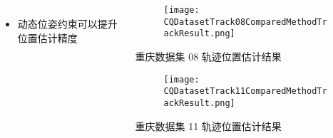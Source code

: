 \begin{frame}
\begin{columns}[t]
\begin{column}{0.6\textwidth}
{{\begin{tabular*}{1.2\linewidth}{@{\extracolsep{\fill}}clrrrrrrrrrrr}
					\bottomrule 
				\end{tabular*}
		   	}}
			\begin{itemize}
				\item 动态位姿约束可以提升位置估计精度
			\end{itemize}
		\end{column} 
		\begin{column}{0.4\textwidth}
    		\vspace{-3.2cm}  
		   	\begin{figure}
    			\texttt{[image: CQDatasetTrack08ComparedMethodTrackResult.png]}
		   	\end{figure}
		   	\vspace{-0.5cm}
		   	\hspace{0.5cm} {\tiny 重庆数据集 08 轨迹位置估计结果}
		   	\vspace{-0.2cm}
		   	\begin{figure}
				\texttt{[image: CQDatasetTrack11ComparedMethodTrackResult.png]}
		   	\end{figure}
		   	\vspace{-0.5cm}
		   	\hspace{0.5cm} {\tiny 重庆数据集 11 轨迹位置估计结果}
		\end{column}    
	\end{columns}
\end{frame}

